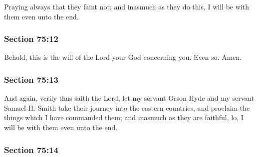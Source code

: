		Praying always that they faint not; and inasmuch as they do this, I will be with them even unto the end.


	\subsubsection{Section 75:12} %
		\label{DC75-12}

		Behold, this is the will of the Lord your God concerning you.  Even so.  Amen.


	\subsubsection{Section 75:13} %
		\label{DC75-13}

		And again, verily thus saith the Lord, let my servant Orson Hyde and my servant Samuel H. Smith take their journey into the eastern countries, and proclaim the things which I have commanded them; and inasmuch as they are faithful, lo, I will be with them even unto the end.


	\subsubsection{Section 75:14} %
		\label{DC75-14}

